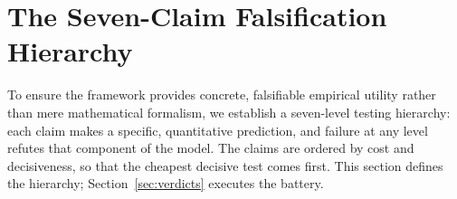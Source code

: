 \documentclass[11pt,a4paper]{article}
\theoremstyle{plain}
\theoremstyle{definition}
\theoremstyle{remark}
\begin{document}

\section{The Seven-Claim Falsification Hierarchy}\label{sec:hierarchy}

To ensure the framework provides concrete, falsifiable empirical
utility rather than mere mathematical formalism, we establish a
seven-level testing hierarchy: each claim makes a specific,
quantitative prediction, and failure at any level refutes that
component of the model. The claims are ordered by cost and
decisiveness, so that the cheapest decisive test comes first. This
section defines the hierarchy; Section~\ref{sec:verdicts} executes
the battery.
\end{document}
